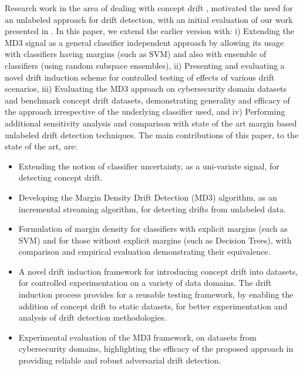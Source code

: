 \documentclass[authoryear,3p,times,twocolumn]{elsarticle}
\begin{document}
Research work in the area of dealing with concept drift \citep{sethi2016grid}, motivated the need for an unlabeled approach for drift detection, with an initial evaluation of our work presented in \citep{tsethi}. In this paper, we extend the earlier version with: i) Extending the MD3 signal as a general classifier independent approach by allowing its usage with classifiers having margins (such as SVM) and also with ensemble of classifiers (using random subspace ensembles), ii) Presenting and evaluating a novel drift induction scheme for controlled testing of effects of various drift scenarios, iii) Evaluating the MD3 approach on cybersecurity domain datasets and benchmark concept drift datasets, demonstrating generality and efficacy of the approach irrespective of the underlying classifier used, and iv) Performing additional sensitivity analysis and comparison with state of the art margin based unlabeled drift detection techniques. The main contributions of this paper, to the state of the art, are: 

\begin{itemize}
\item Extending the notion of classifier uncertainty, as a uni-variate signal, for detecting concept drift. 

\item Developing the Margin Density Drift Detection (MD3) algorithm, as an incremental streaming algorithm, for detecting drifts from unlabeled data. 

\item Formulation of margin density for classifiers with explicit margins (such as SVM) and for those without explicit margins (such as Decision Trees), with comparison and empirical evaluation demonstrating their equivalence. 

\item A novel drift induction framework for introducing concept drift into datasets, for controlled experimentation on a variety of data domains. The drift induction process provides for a reusable testing framework, by enabling the addition of concept drift to static datasets, for better experimentation and analysis of drift detection methodologies. 

\item Experimental evaluation of the MD3 framework, on datasets from cybersecurity domains, highlighting the efficacy of the  proposed approach in providing reliable and robust adversarial drift detection. 
\end{itemize}
\end{document}
